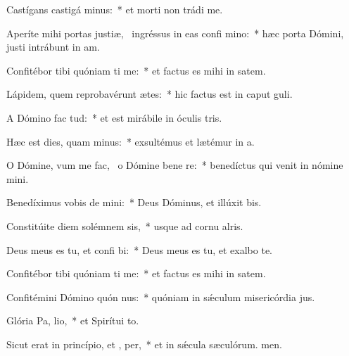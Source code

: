 \item Castígans castigá  minus:~* et morti non trádi me.
\item Aperíte mihi portas justiæ,~\pscross{} ingréssus in eas confi mino:~* hæc porta Dómini, justi intrábunt in am.
\item Confitébor tibi quóniam ti me:~* et factus es mihi in satem.
\item Lápidem, quem reprobavérunt ætes:~* hic factus est in caput guli.
\item A Dómino fac  tud:~* et est mirábile in óculis tris.
\item Hæc est dies, quam  minus:~* exsultémus et lætémur in a.
\item O Dómine, vum me fac,~\pscross{} o Dómine bene re:~* benedíctus qui venit in nómine mini.
\item Benedíximus vobis de  mini:~* Deus Dóminus, et illúxit bis.
\item Constitúite diem solémnem  sis,~* usque ad cornu alris.
\item Deus meus es tu, et confi bi:~* Deus meus es tu, et exalbo te.
\item Confitébor tibi quóniam ti me:~* et factus es mihi in satem.
\item Confitémini Dómino quón nus:~* quóniam in sǽculum misericórdia jus.
\item Glória Pa,  lio,~* et Spirítui to.
\item Sicut erat in princípio, et ,  per,~* et in sǽcula sæculórum. men.
